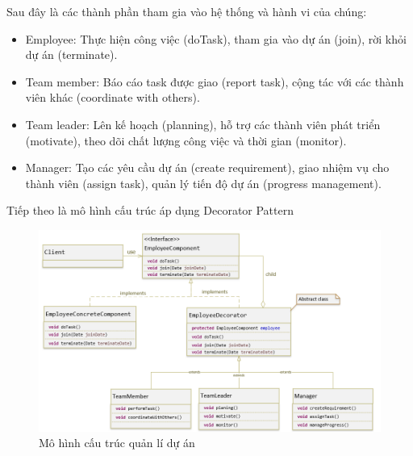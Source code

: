 Sau đây là các thành phần tham gia vào hệ thống và hành vi của chúng:
\begin{itemize}
    \item Employee: Thực hiện công việc (doTask), tham gia vào dự án (join), rời khỏi dự án (terminate).
    \item Team member: Báo cáo task được giao (report task), cộng tác với các thành viên khác (coordinate with others).
    \item Team leader: Lên kế hoạch (planning), hỗ trợ các thành viên phát triển (motivate), theo dõi chất lượng công việc và thời gian (monitor).
    \item Manager: Tạo các yêu cầu dự án (create requirement), giao nhiệm vụ cho thành viên (assign task), quản lý tiến độ dự án (progress management).
\end{itemize}
Tiếp theo là mô hình cấu trúc áp dụng Decorator Pattern
\begin{figure}[!htb]
 \centering
 \includegraphics[width=\textwidth]{fig/Decorator/decorator_example.png}
 \caption{Mô hình cấu trúc quản lí dự án}
 \label{fig:decorator_example}
\end{figure}
 

